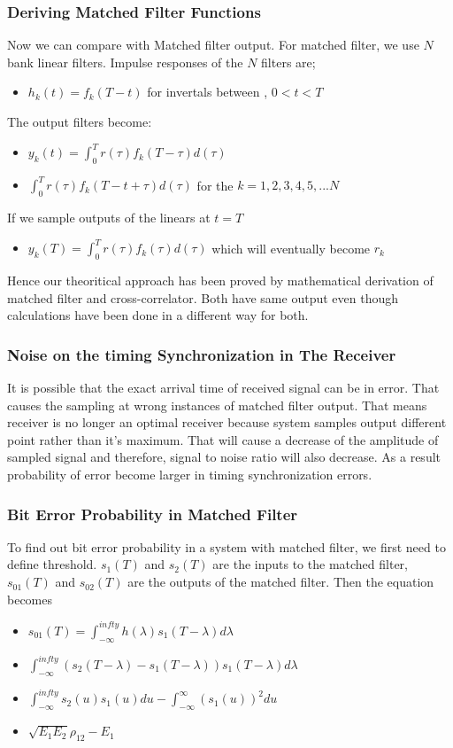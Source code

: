 \documentclass{beamer}
\begin{document}
\begin{frame}
	\frametitle{Deriving Matched Filter Functions}
Now we can compare with Matched filter output. For matched filter, we use $N$ bank linear filters. Impulse responses of the $N$ filters are;
\begin{itemize}
	\item $h_k(t)=f_k(T-t)$ for invertals between , $0<t<T$
\end{itemize}

The output filters become:
\begin{itemize}
	\item $y_k(t)=\int_{0}^{T} r(\tau) f_k(T-\tau)d(\tau)$
	\item $\int_{0}^{T} r(\tau) f_k(T-t+\tau)d(\tau)$ for the $k= 1,2,3,4,5,...N$
\end{itemize}
If we sample outputs of the linears at $t=T$
\begin{itemize}
\item $y_k(T)=\int_{0}^{T} r(\tau) f_k(\tau)d(\tau)$ which will eventually become $r_k$
\end{itemize}

Hence our theoritical approach has been proved by mathematical derivation of matched filter and cross-correlator. Both have same output even though calculations have been done in a different way for both.
\end{frame}

\begin{frame}
	\frametitle{Noise on the timing Synchronization in The Receiver}
It is possible that the exact arrival time of received signal can be in error. That causes the sampling at wrong instances of matched filter output. That means receiver is no longer an optimal receiver because system samples output different point rather than it's maximum. That will cause a decrease of the amplitude of sampled signal and therefore, signal to noise ratio will also decrease. As a result probability of error become larger in timing synchronization errors. 
\end{frame}

\begin{frame}
	\frametitle{Bit Error Probability in Matched Filter}
To find out bit error probability in a system with matched filter, we first need to define threshold. $s_1(T)$ and $s_2(T)$ are the inputs to the matched filter, $s_{01}(T)$ and $s_{02}(T)$ are the outputs of the matched filter. Then the equation becomes
\begin{itemize}
	\item $s_{01}(T)=\int_{-\infty}^{infty} h(\lambda) s_1(T-\lambda) d \lambda $
    	\item $ \int_{-\infty}^{infty} ( s_2(T-\lambda) - s_1(T-\lambda)) s_1(T-\lambda) d \lambda $
	\item  $\int_{-\infty}^{infty} s_2(u) s_1(u) du - \int_{-\infty}^{\infty} (s_1(u))^2 du $
    	\item $ \sqrt{E_1 E_2} \rho_{12} - E_1 $
\end{itemize}

\end{frame}
\end{document}
